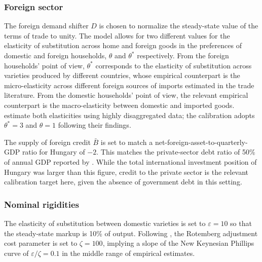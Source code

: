 \documentclass[\latexroot/\projectname]{subfiles}
\begin{document}
\subsubsection{Foreign sector}\whenintegrated{\label{sec:calibration-foreign}}

The foreign demand shifter $D$ is chosen to normalize the steady-state value of the terms of trade to unity. The model allows for two different values for the elasticity of substitution across home and foreign goods in the preferences of domestic and foreign households, $\theta$ and $\theta^{*}$ respectively. From the foreign households' point of view, $\theta^{*}$ corresponds to the elasticity of substitution across varieties produced by different countries, whose empirical counterpart is the micro-elasticity across different foreign sources of imports estimated in the trade literature. From the domestic households' point of view, the relevant empirical counterpart is the macro-elasticity between domestic and imported goods. \citet{FeenstraLuckObstfeldRuss2018} estimate both elasticities using highly disaggregated data; the calibration adopts $\theta^{*} = 3$ and $\theta = 1$ following their findings.

The supply of foreign credit $\bar{B}$ is set to match a net-foreign-asset-to-quarterly-GDP ratio for Hungary of $-2$. This matches the private-sector debt ratio of 50\% of annual GDP reported by \citet{IMF2008HungaryArticleIV}. While the total international investment position of Hungary was larger than this figure, credit to the private sector is the relevant calibration target here, given the absence of government debt in this setting.

\subsubsection{Nominal rigidities}\whenintegrated{\label{sec:calibration-nominal}}

The elasticity of substitution between domestic varieties is set to $\varepsilon = 10$ so that the steady-state markup is 10\% of output. Following \citet{KaplanMollViolante2018AER}, the Rotemberg adjustment cost parameter is set to $\zeta = 100$, implying a slope of the New Keynesian Phillips curve of $\varepsilon/\zeta = 0.1$ in the middle range of empirical estimates.

\smartbib
\end{document}
